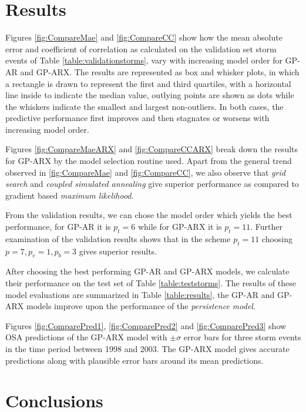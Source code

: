 \documentclass[sw, draft]{AGUTeX}
\begin{document}
\begin{article}
\section{Results}\label{sec:res}

Figures \ref{fig:CompareMae} and \ref{fig:CompareCC} show how the mean absolute error and coefficient of correlation as calculated on the validation set storm events of Table \ref{table:validationstorms}, vary with increasing model order for GP-AR and GP-ARX. The results are represented as box and whisker plots, in which a rectangle is drawn to represent the first and third quartiles, with a horizontal line inside to indicate the median value, outlying points are shown as dots while the whiskers indicate the smallest and largest non-outliers. In both cases, the predictive performance first improves and then stagnates or worsens with increasing model order. 

Figures \ref{fig:CompareMaeARX} and \ref{fig:CompareCCARX} break down the results for GP-ARX by the model selection routine used. Apart from the general trend observed in \ref{fig:CompareMae} and \ref{fig:CompareCC}, we also observe that \emph{grid search} and \emph{coupled simulated annealing} give superior performance as compared to gradient based \emph{maximum likelihood}.

From the validation results, we can chose the model order which yields the best performance, for GP-AR it is $p_t = 6$ while for GP-ARX it is $p_t = 11$. Further examination of the validation results shows that in the scheme $p_t = 11$ choosing $p = 7, p_v = 1, p_b = 3$ gives superior results.

After choosing the best performing GP-AR and GP-ARX models, we calculate their performance on the test set of Table \ref{table:teststorms}. The results of these model evaluations are summarized in Table \ref{table:results}, the GP-AR and GP-ARX models improve upon the performance of the \emph{persistence model}.

Figures \ref{fig:ComparePred1}, \ref{fig:ComparePred2} and \ref{fig:ComparePred3} show OSA predictions of the GP-ARX model with $\pm \sigma$ error bars for three storm events in the time period between 1998 and 2003. The GP-ARX model gives accurate predictions along with plausible error bars around its mean predictions.

\section{Conclusions}


\end{article}
\end{document}

